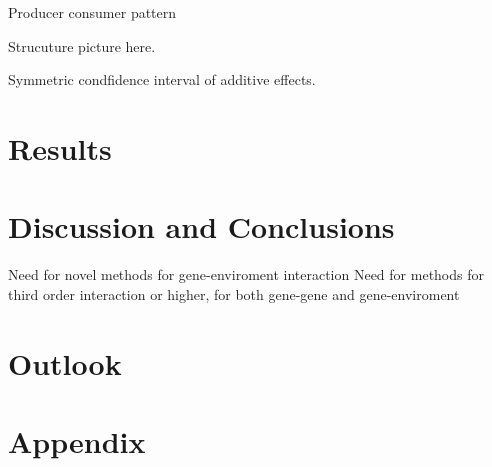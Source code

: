 \documentclass[10pt,a4paper]{article}
\begin{document}
Producer consumer pattern

Strucuture picture here.

Symmetric condfidence interval of additive effects.


\section{Results}


\section{Discussion and Conclusions}
Need for novel methods for gene-enviroment interaction
Need for methods for third order interaction or higher, for both gene-gene and gene-enviroment

\section{Outlook}

\section{Appendix}


\newpage


\end{document}
